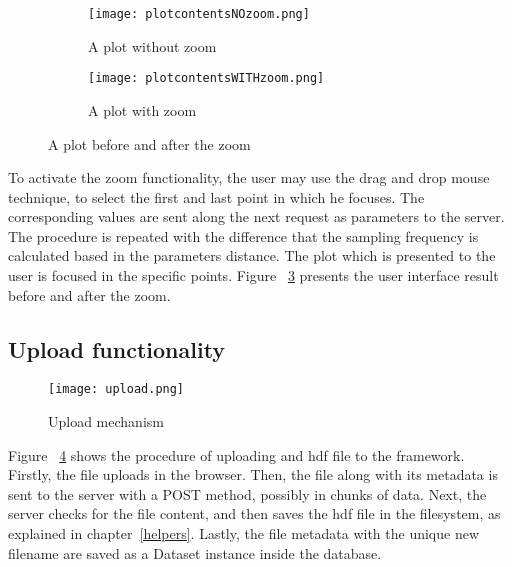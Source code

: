 \begin{figure}
\centering
\begin{subfigure}{1\textwidth}
  \centering
  \centerline{\texttt{[image: plotcontentsNOzoom.png]}}
  \caption{A plot without zoom}
  \label{fig:sub1}
\end{subfigure}
\begin{subfigure}{1\textwidth}
  \centering
  \centerline{\texttt{[image: plotcontentsWITHzoom.png]}}
  \caption{A plot with zoom}
  \label{fig:sub2}
\end{subfigure}
\caption{A plot before and after the zoom}
\label{fig:test}
\end{figure}

	To activate the zoom functionality, the user may use the drag and drop mouse technique, to select the first and last point in which he focuses. The corresponding values are sent along the next request as parameters to the server. The procedure is repeated with the difference that the sampling frequency is calculated based in the parameters distance. The plot which is presented to the user is focused in the specific points.	Figure ~\ref{fig:test} presents the user interface result before and after the zoom.
	
\subsection{Upload functionality}
\begin{figure}
	\centerline{\texttt{[image: upload.png]}}
	\caption{Upload mechanism}
	\label{upload}
\end{figure}
Figure ~\ref{upload} shows the procedure of uploading and hdf file to the framework. Firstly, the file uploads in the browser. Then, the file along with its metadata is sent to the server with a POST method, possibly in chunks of data.  Next, the server checks for the file content, and then saves the hdf file in the filesystem, as explained in chapter~\ref{helpers}. Lastly, the file metadata with the unique new filename are saved as a Dataset instance inside the database.

